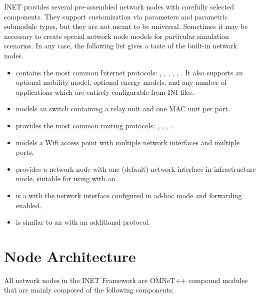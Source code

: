INET provides several pre-assembled network nodes with carefully selected
components. They support customization via parameters and parametric
submodule types, but they are not meant to be universal. Sometimes it may
be necessary to create special network node models for particular
simulation scenarios. In any case, the following list gives a taste of the
built-in network nodes.

\begin{itemize}
  \item {} contains the most common Internet protocols:
     , , , ,
     , . It also supports an
     optional mobility model, optional energy models, and any number of
     applications which are entirely configurable from INI files.
  \item {} models an  switch containing
     a relay unit and one MAC unit per port.
  \item {} provides the most common routing protocols:
     , , , .
  \item {} models a Wifi access point with multiple
      network interfaces and multiple 
     ports.
  \item {} provides a network node with one (default)
      network interface in infrastructure mode,
     suitable for using with an .
  \item {} is a  with the network
     interface configured in ad-hoc mode and forwarding enabled.
  \item {} is similar to an  with
     an additional  protocol.
\end{itemize}

\section{Node Architecture}

All network nodes in the INET Framework are OMNeT++ compound modules that are
mainly composed of the following components:

